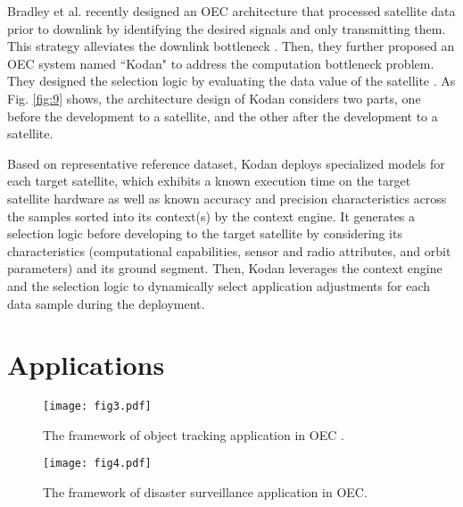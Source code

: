 \documentclass[lettersize,journal]{IEEEtran}
\begin{document}
Bradley et al. recently designed an OEC architecture that processed satellite data prior to downlink by identifying the desired signals and only transmitting them. This strategy alleviates the downlink bottleneck \cite{RN57,RN187}. Then, they further proposed an OEC system named ``Kodan" to address the computation bottleneck problem. They designed the selection logic by evaluating the data value of the satellite \cite{denby2023kodan}. As Fig. \ref{fig:9} shows, the architecture design of Kodan considers two parts, one before the development to a satellite, and the other after the development to a satellite. 

Based on representative reference dataset, Kodan deploys specialized models for each target satellite, which exhibits a known execution time on the target satellite hardware as well as known accuracy and precision characteristics across the samples sorted into its context(s) by the context engine. It generates a selection logic before developing to the target satellite by considering its characteristics (computational capabilities, sensor and radio attributes, and orbit parameters) and its ground segment. Then, Kodan leverages the context engine and the selection logic to dynamically select application adjustments for each data sample during the deployment.


\section{Applications}
\label{sec3}
%

\begin{figure}[htpb!]
  \centering
  \texttt{[image: fig3.pdf]}
  \caption{The framework of object tracking application in OEC \cite{RN55}.} 
  \label{Fig2}
\end{figure}


\begin{figure}[htpb!]
  \centering
  \texttt{[image: fig4.pdf]}
  \caption{The framework of disaster surveillance application in OEC.} 
  \label{Fig3}
\end{figure} 
\end{document}
